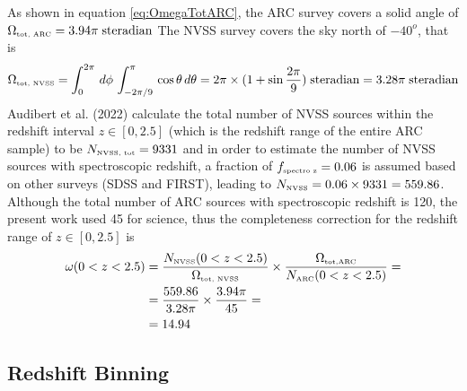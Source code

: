 As shown in equation \ref{eq:OmegaTotARC}, the ARC survey covers a solid angle of $\Omega_{\mbox{\tiny{tot, ARC}}} = 3.94\pi \;\mbox{steradian}$
The NVSS survey\cite{NVSS} covers the sky north of $-40^o$, that is 
\begin{equation*}
    \Omega_{\mbox{\tiny{tot, NVSS}}} = \int_{0}^{2\pi}\,d\phi\, \int_{-2\pi/9}^{\pi}\, \cos \theta\,d\theta = 2\pi \times (1+\sin\frac{2\pi}{9}) \; \mbox{steradian}= 3.28 \pi\; \mbox{steradian}
\end{equation*}
Audibert et al. (2022)\cite{Audibert2022} calculate the total number of NVSS sources within the redshift interval $z\in[0,2.5]$ (which is the redshift range of the entire ARC sample) to be $N_{\mbox{\tiny{NVSS, tot}}} =  9331$ and in order to estimate the number of NVSS sources with spectroscopic redshift, a fraction of $f_{\mbox{\tiny{spectro z}}} = 0.06$ is assumed based on other surveys (SDSS and FIRST), leading to $N_{\mbox{\tiny{NVSS}}} = 0.06\times 9331 = 559.86$. Although the total number of ARC sources with spectroscopic redshift is 120, the present work used 45 for science, thus the completeness correction for the redshift range of $z\in[0,2.5]$ is 
\begin{equation}\begin{aligned}
    \omega(0< z<2.5) &= \dfrac{N_{\mbox{\tiny{NVSS}}}(0< z<2.5)}{\Omega_{\mbox{\tiny{tot, NVSS}}}} \times  \dfrac{\Omega_{\mbox{\tiny{tot,ARC}}}}{N_{\mbox{\tiny{ARC}}}(0< z<2.5)}  =  \\ 
    & = \dfrac{559.86}{3.28 \pi} \times  \dfrac{3.94\pi}{45} = \\ & = 14.94
    \end{aligned} 
\label{eq:weight_tot}
\end{equation}

\subsection{Redshift Binning} \label{subsec:Res/ComplCorr}


